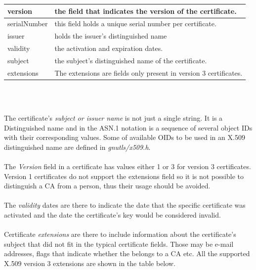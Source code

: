 \label{fig:x509}
\begin{tabular}{|l||l|}
\hline
version & the field that indicates the version of the certificate.
\\
\hline
serialNumber & this field holds a unique serial number per certificate.
\\
\hline
issuer & holds the issuer's distinguished name
\\
\hline
validity & the activation and expiration dates.
\\
\hline
subject & the subject's distinguished name of the certificate.
\\
\hline
\rowcolor[gray]{0.9}
extensions & The extensions are fields only present in version 3 certificates.
\\
\hline
\end{tabular}
\\
\\
\par
The certificate's \emph{subject or issuer name} is not just a single string. It is
a Distinguished name and in the ASN.1 notation is a sequence of several object
IDs with their corresponding values. Some of available OIDs to be used in an X.509
distinguished name are defined in \emph{gnutls/x509.h}.
\\
\\
The \emph{Version} field in a certificate has values either 1 or 3 for version 3 certificates.
Version 1 certificates do not support the extensions field so it is not possible
to distinguish a CA from a person, thus their usage should be avoided.
\\
\\
The \emph{validity} dates are there to indicate the date that the specific certificate
was activated and the date the certificate's key would be considered invalid.
\\
\\
Certificate \emph{extensions} are there to include information about the certificate's
subject that did not fit in the typical certificate fields. Those may be
e-mail addresses, flags that indicate whether the belongs to a CA etc.
All the supported X.509 version 3 extensions are shown in the table below.

